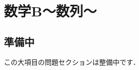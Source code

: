 \documentclass[../../ms_q.tex]{subfiles}
\begin{document}
\section{数学B～数列～}

\subsection*{準備中}
この大項目の問題セクションは整備中です．
\end{document}
